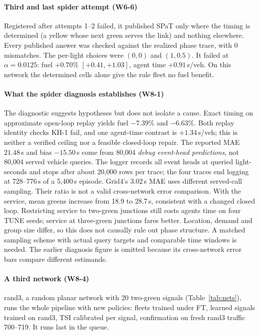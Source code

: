 \paragraph{Third and last spider attempt (W6-6)} Registered after attempts 1--2 failed, it published SPaT only where the timing is
determined (a yellow whose next green serves the link) and nothing elsewhere. Every published answer was checked against the realized
phase trace, with 0 mismatches. The per-light choices were $(0,0)$ and $(1,0.5)$. It failed at $\alpha=0.0125$: fuel $+0.70\%$
$[+0.41,+1.03]$, agent time $+0.91$\,s/veh. On this network the determined cells alone give the rule fleet no fuel benefit.

\paragraph{What the spider diagnosis establishes (W8-1)}
The diagnostic suggests hypotheses but does not isolate a cause. Exact timing on approximate open-loop replay yields fuel $-7.39\%$ and $-6.63\%$. Both replay identity checks KH-1 fail, and one agent-time contrast is $+1.34$\,s/veh; this is neither a verified ceiling nor a feasible closed-loop repair.
The reported MAE $21.48$\,s and bias $-15.50$\,s come from 80,004 \emph{debug event-head predictions}, not 80,004 served vehicle queries. The logger records all event heads at queried light-seconds and stops after about 20,000 rows per trace; the four traces end logging at 728--776\,s of a 5,400\,s episode. Grid4's $3.02$\,s MAE uses different served-call sampling. Their ratio is not a valid cross-network error comparison.
With the service, mean greens increase from 18.9 to 28.7\,s, consistent with a changed closed loop. Restricting service to two-green junctions still costs agents time on four TUNE seeds; service at three-green junctions fares better. Location, demand and group size differ, so this does not causally rule out phase structure. A matched sampling scheme with actual query targets and comparable time windows is needed. The earlier diagnosis figure is omitted because its cross-network error bars compare different estimands.

\paragraph{A third network (W8-4)} rand3, a random planar network with 20 two-green signals (Table~\ref{tab:nets}), runs the whole
pipeline with new policies: fleets trained under FT, learned signals trained on rand3, TSI calibrated per signal, confirmation on fresh
rand3 traffic 700--719. It runs last in the queue.

